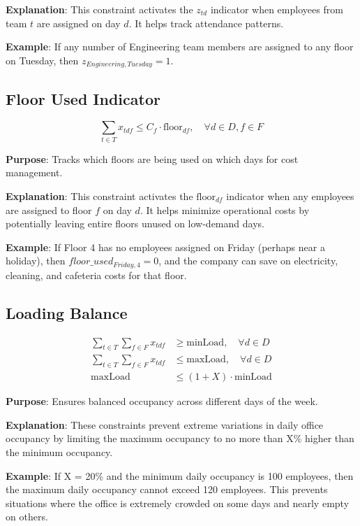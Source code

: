 \documentclass[12pt]{article}
\begin{document}
\textbf{Explanation}: This constraint activates the $z_{td}$ indicator when employees from team $t$ are assigned on day $d$. It helps track attendance patterns.

\textbf{Example}: If any number of Engineering team members are assigned to any floor on Tuesday, then $z_{Engineering,Tuesday} = 1$.

\subsection{Floor Used Indicator}
\begin{equation}
\sum_{t \in T} x_{tdf} \leq C_f \cdot \text{floor}_{df}, \quad \forall d \in D, f \in F
\end{equation}

\textbf{Purpose}: Tracks which floors are being used on which days for cost management.

\textbf{Explanation}: This constraint activates the $\text{floor}_{df}$ indicator when any employees are assigned to floor $f$ on day $d$. It helps minimize operational costs by potentially leaving entire floors unused on low-demand days.

\textbf{Example}: If Floor 4 has no employees assigned on Friday (perhaps near a holiday), then $floor\_used_{Friday,4} = 0$, and the company can save on electricity, cleaning, and cafeteria costs for that floor.

\subsection{Loading Balance}
\begin{align}
\sum_{t \in T} \sum_{f \in F} x_{tdf} &\geq \text{minLoad}, \quad \forall d \in D\\
\sum_{t \in T} \sum_{f \in F} x_{tdf} &\leq \text{maxLoad}, \quad \forall d \in D\\
\text{maxLoad} &\leq (1 + X) \cdot \text{minLoad}
\end{align}

\textbf{Purpose}: Ensures balanced occupancy across different days of the week.

\textbf{Explanation}: These constraints prevent extreme variations in daily office occupancy by limiting the maximum occupancy to no more than X\% higher than the minimum occupancy.

\textbf{Example}: If X = 20\% and the minimum daily occupancy is 100 employees, then the maximum daily occupancy cannot exceed 120 employees. This prevents situations where the office is extremely crowded on some days and nearly empty on others.
\end{document}
